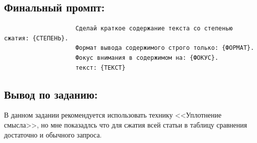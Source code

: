 \subsection{Финальный промпт:}
\begin{verbatim}
					Сделай краткое содержание текста со степенью сжатия: {СТЕПЕНЬ}.
					Формат вывода содержимого строго только: {ФОРМАТ}.
					Фокус внимания в содержимом на: {ФОКУС}.
					текст: {ТЕКСТ}
\end{verbatim}
\subsection{Вывод по заданию:}
\indent В данном задании рекомендуется использовать технику <<Уплотнение смысла>>, но мне показадлсь что для сжатия всей статьи в таблицу сравнения достаточно и обычного запроса.